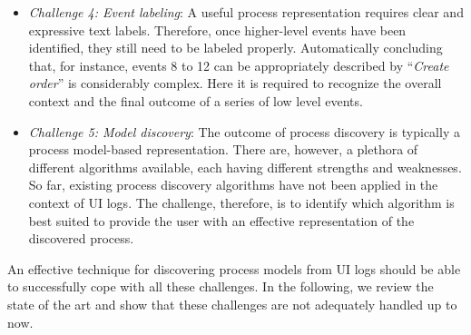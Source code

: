\begin{itemize}
\item \textit{Challenge 4: Event labeling}: A useful process representation requires clear and expressive text labels. Therefore, once higher-level events have been identified, they still need to be labeled properly. Automatically concluding that, for instance, events 8 to 12 can be appropriately described by ``\textit{Create order}'' is considerably complex. Here it is required to recognize the overall context and the final outcome of a series of low level events.  
 
\item  \textit{Challenge 5: Model discovery}: The outcome of process discovery is typically a process model-based representation. There are, however, a plethora of different algorithms available, each having different strengths and weaknesses. So far, existing process discovery algorithms have not been applied in the context of UI logs. The challenge, therefore, is to identify which algorithm is best suited to provide the user with an effective representation of the discovered process. 
 \end{itemize}

An effective technique for discovering process models from UI logs should be able to successfully cope with all these challenges. In the following, we review the state of the art and show that these challenges are not adequately handled up to now. 